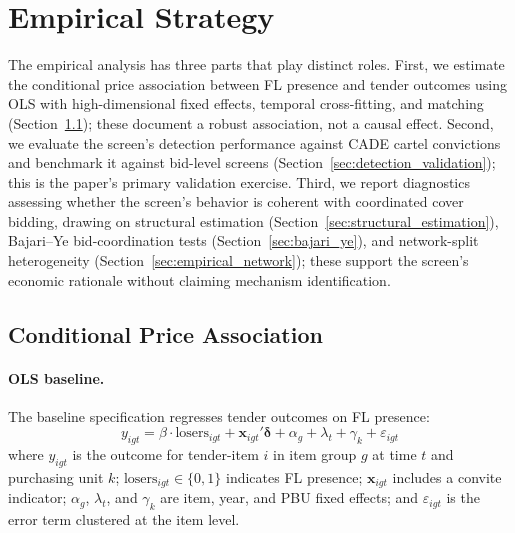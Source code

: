 

\section{Empirical Strategy}
\label{sec:empirical}

The empirical analysis has three parts that play distinct roles.
First, we estimate the conditional price association between FL
presence and tender outcomes using OLS with high-dimensional fixed
effects, temporal cross-fitting, and matching
(Section~\ref{sec:reduced_form}); these document a robust
association, not a causal effect.
Second, we evaluate the screen's detection performance against CADE
cartel convictions and benchmark it against bid-level screens
(Section~\ref{sec:detection_validation}); this is the paper's
primary validation exercise.
Third, we report diagnostics assessing whether the screen's behavior
is coherent with coordinated cover bidding, drawing on structural
estimation (Section~\ref{sec:structural_estimation}), Bajari--Ye
bid-coordination tests (Section~\ref{sec:bajari_ye}), and
network-split heterogeneity
(Section~\ref{sec:empirical_network}); these support the screen's
economic rationale without claiming mechanism identification.


\subsection{Conditional Price Association}
\label{sec:reduced_form}

\paragraph{OLS baseline.}
The baseline specification regresses tender outcomes on FL presence:
\begin{equation}
  y_{igt} = \beta \cdot \text{losers}_{igt} + \mathbf{x}_{igt}'
  \boldsymbol{\delta} + \alpha_g + \lambda_t + \gamma_k + \varepsilon_{igt}
  \label{eq:ols_main}
\end{equation}
where $y_{igt}$ is the outcome for tender-item $i$ in item group $g$ at
time $t$ and purchasing unit $k$; $\text{losers}_{igt} \in \{0,1\}$
indicates FL presence; $\mathbf{x}_{igt}$ includes a convite indicator;
$\alpha_g$, $\lambda_t$, and $\gamma_k$ are item, year, and PBU fixed
effects; and $\varepsilon_{igt}$ is the error term clustered at the item
level.

